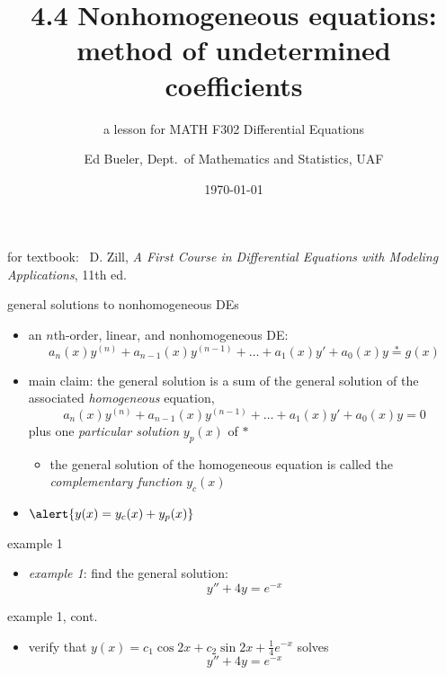 \documentclass{beamer}
\title{4.4 Nonhomogeneous equations: \\ method of undetermined coefficients}
\subtitle{a lesson for MATH F302 Differential Equations}
\author{Ed Bueler, Dept.~of Mathematics and Statistics, UAF}
\date{\tiny \today}
\begin{document}


\begin{frame}
\titlepage

\centerline{\tiny for textbook: \, D. Zill, \emph{A First Course in Differential Equations with Modeling Applications}, 11th ed.}
\end{frame}


\begin{frame}{general solutions to nonhomogeneous DEs}

\begin{itemize}
\item an $n$th-order, linear, and nonhomogeneous DE:
\begin{equation*}
    a_n(x) y^{(n)} + a_{n-1}(x) y^{(n-1)} + \dots + a_1(x) y' + a_0(x) y \stackrel{\ast}{=} g(x)
\end{equation*}
\item \alert{main claim:} the general solution is a sum of the general solution of the associated \emph{homogeneous} equation,
\begin{equation*}
    a_n(x) y^{(n)} + a_{n-1}(x) y^{(n-1)} + \dots + a_1(x) y' + a_0(x) y = 0
\end{equation*}
plus one \emph{particular solution} $y_p(x)$ of $\ast$
    \begin{itemize}
    \item the general solution of the homogeneous equation is called the \emph{complementary function} $y_c(x)$
    \end{itemize}

\bigskip
\item $\alert{y(x) = y_c(x) + y_p(x)}$
\end{itemize}
\end{frame}


\begin{frame}{example 1}

\begin{itemize}
\item \emph{example 1}: find the general solution:
    $$y'' + 4 y = e^{-x}$$
\end{itemize}

\vspace{60mm}
\end{frame}


\begin{frame}{example 1, cont.}

\begin{itemize}
\item verify that $y(x) = c_1 \cos 2x + c_2 \sin 2x + \frac{1}{4} e^{-x}$ solves
    $$y'' + 4 y = e^{-x}$$

\vspace{60mm}
\end{itemize}
\end{frame}
\end{document}
